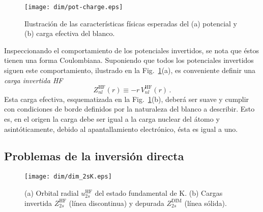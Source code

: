 \begin{figure}[t!]
\centering
\texttt{[image: dim/pot-charge.eps]}
\vspace{-0.3cm}
\caption[Características físicas del potencial y carga efectiva.]
{Ilustración de las características físicas esperadas del (a) potencial 
y (b) carga efectiva del blanco.}
\label{fig:potycharge}
\end{figure}

Inspeccionando el comportamiento de los potenciales invertidos, se nota 
que éstos tienen una forma Coulombiana. Suponiendo que todos los 
potenciales invertidos siguen este comportamiento, ilustrado en la 
Fig.~\ref{fig:potycharge}(a), es conveniente definir una 
\textit{carga invertida HF} 
\begin{equation}
Z_{nl}^{\mathrm{HF}}(r) \equiv -r \, V_{nl}^{\mathrm{HF}}(r) \,.
\label{eq:Zeff}
\end{equation}
Esta carga efectiva, esquematizada en la Fig.~\ref{fig:potycharge}(b), 
deberá ser suave y cumplir con condiciones de borde definidos por la 
naturaleza del blanco a describir. Esto es, en el origen la carga debe 
ser igual a la carga nuclear del átomo y asintóticamente, debido al 
apantallamiento electrónico, ésta es igual a uno.

\subsection{Problemas de la inversión directa}
\label{subsec:probinv}

\begin{figure}
\centering
\texttt{[image: dim/dim\_2sK.eps]} 
\vspace{-0.3cm}
\caption[Orbital radial y carga efectiva correspondiente.]
{(a) Orbital radial $u_{2s}^{\mathrm{HF}}$ del estado fundamental de K.
(b) Cargas invertida $Z_{2s}^{\mathrm{HF}}$ (línea discontinua) 
y depurada $Z_{2s}^{\mathrm{DIM}}$ (línea sólida).}
\label{fig:2sK}
\end{figure}

